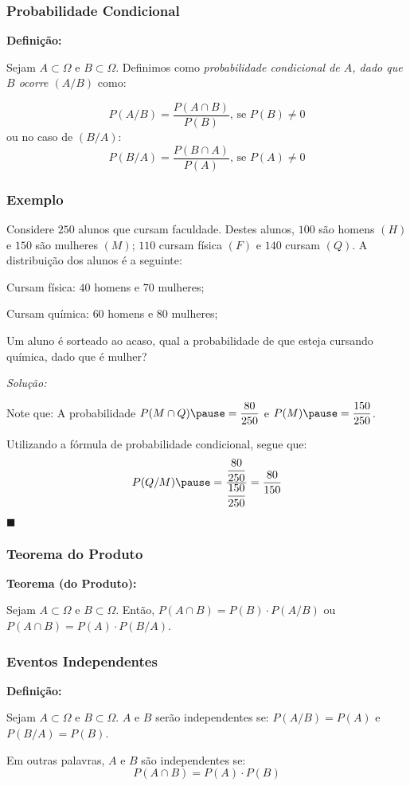 \documentclass[hyperref={pdfpagelabels=false}]{beamer}
\begin{document}
\begin{frame}
\frametitle{Probabilidade Condicional}

{\bf Definição:}

Sejam $A \subset \Omega$ e $B \subset \Omega$. Definimos como {\it probabilidade condicional de $A$, dado que $B$ ocorre $(A/B)$} como:

$$P(A/B) = \frac{P(A \cap B)}{P(B)} \text{, se } P(B) \neq 0$$
ou no caso de $(B/A)$:
$$P(B/A) = \frac{P(B \cap A)}{P(A)} \text{, se } P(A) \neq 0$$

\end{frame}


\begin{frame}
\frametitle{Exemplo}

Considere $250$ alunos que cursam faculdade. Destes alunos, $100$ são homens $(H)$ e $150$ são mulheres $(M)$; $110$ cursam física $(F)$ e $140$ cursam $(Q)$. A distribuição dos alunos é a seguinte:

Cursam física: $40$ homens e $70$ mulheres;

Cursam química: $60$ homens e $80$ mulheres;

Um aluno é sorteado ao acaso, qual a probabilidade de que esteja cursando química, dado que é mulher?

\pause
{\it Solução:}

Note que:
A probabilidade $P(M \cap Q) \pause = \displaystyle \frac{80}{250}$ e $P(M) \pause = \displaystyle \frac{150}{250}$.

Utilizando a fórmula de probabilidade condicional, segue que:
$$P(Q/M) \pause = \displaystyle\frac{\displaystyle\frac{80}{250}}{\displaystyle\frac{150}{250}} = \displaystyle\frac{80}{150}$$
\begin{flushright}
	$\blacksquare$
\end{flushright}


\end{frame}

\begin{frame}
\frametitle{Teorema do Produto}

{\bf Teorema (do Produto):}

Sejam $A \subset \Omega$ e $B \subset \Omega$. Então, $P(A \cap B) = P(B) \cdot P(A/B)$ ou $P(A \cap B) = P(A) \cdot P(B/A)$.

\end{frame}

\begin{frame}
\frametitle{Eventos Independentes}

{\bf Definição:}

Sejam $A \subset \Omega$ e $B \subset \Omega$. $A$ e $B$ serão independentes se: $P(A/B) = P(A)$ e $P(B/A) = P(B)$.

\pause
Em outras palavras, $A$ e $B$ são independentes se:
$$P(A \cap B) =P(A)\cdot P(B)$$

\end{frame}
\end{document}
